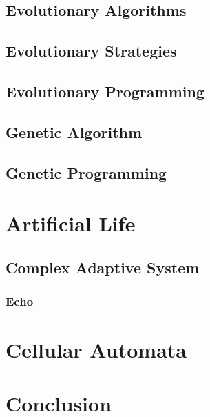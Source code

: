\subsection{Evolutionary Algorithms}

\subsection{Evolutionary Strategies}

\subsection{Evolutionary Programming}

\subsection{Genetic Algorithm}

\subsection{Genetic Programming}

\section{Artificial Life}

\subsection{Complex Adaptive System}

\subsubsection{Echo}

\section{Cellular Automata}

\section{Conclusion}
